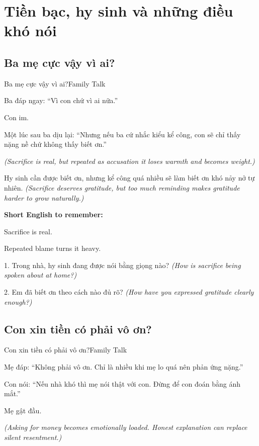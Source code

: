 \chapter{Tiền bạc, hy sinh và những điều khó nói}

\section{Ba mẹ cực vậy vì ai?}
\begin{truyen}{Ba mẹ cực vậy vì ai?}{Family Talk}

Ba đáp ngay: ``Vì con chứ vì ai nữa.''

Con im.

Một lúc sau ba dịu lại: ``Nhưng nếu ba cứ nhắc kiểu kể công, con sẽ chỉ thấy nặng nề chứ không thấy biết ơn.''

\textit{(Sacrifice is real, but repeated as accusation it loses warmth and becomes weight.)}
\end{truyen}

\begin{baihoc}
Hy sinh cần được biết ơn, nhưng kể công quá nhiều sẽ làm biết ơn khó nảy nở tự nhiên.
\textit{(Sacrifice deserves gratitude, but too much reminding makes gratitude harder to grow naturally.)}
\end{baihoc}

\begin{ghinhoanh}
\textbf{Short English to remember:}

Sacrifice is real.

Repeated blame turns it heavy.
\end{ghinhoanh}

\begin{tuhocnhanh}
1. Trong nhà, hy sinh đang được nói bằng giọng nào? \textit{(How is sacrifice being spoken about at home?)}

2. Em đã biết ơn theo cách nào đủ rõ? \textit{(How have you expressed gratitude clearly enough?)}
\end{tuhocnhanh}
\ngancach

\section{Con xin tiền có phải vô ơn?}
\begin{truyen}{Con xin tiền có phải vô ơn?}{Family Talk}

Mẹ đáp: ``Không phải vô ơn. Chỉ là nhiều khi mẹ lo quá nên phản ứng nặng.''

Con nói: ``Nếu nhà khó thì mẹ nói thật với con. Đừng để con đoán bằng ánh mắt.''

Mẹ gật đầu.

\textit{(Asking for money becomes emotionally loaded. Honest explanation can replace silent resentment.)}
\end{truyen}

